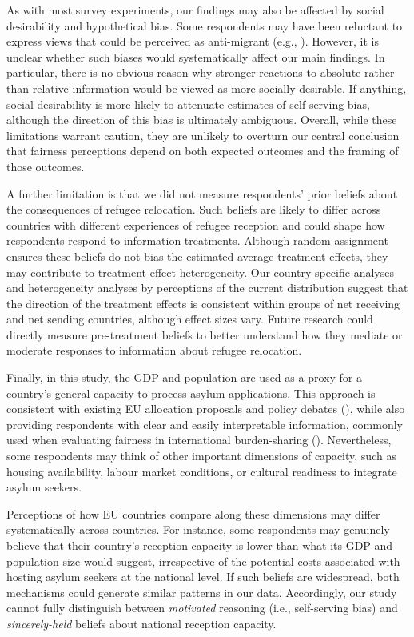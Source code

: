 \documentclass[
  12pt,
  a4paper,
]{article}
\begin{document}
As with most survey experiments, our findings may also be affected by social desirability and hypothetical bias. Some respondents may have been reluctant to express views that could be perceived as anti-migrant (e.g., ). However, it is unclear whether such biases would systematically affect our main findings. In particular, there is no obvious reason why stronger reactions to absolute rather than relative information would be viewed as more socially desirable. If anything, social desirability is more likely to attenuate estimates of self-serving bias, although the direction of this bias is ultimately ambiguous. Overall, while these limitations warrant caution, they are unlikely to overturn our central conclusion that fairness perceptions depend on both expected outcomes and the framing of those outcomes.

A further limitation is that we did not measure respondents' prior beliefs about the consequences of refugee relocation. Such beliefs are likely to differ across countries with different experiences of refugee reception and could shape how respondents respond to information treatments. Although random assignment ensures these beliefs do not bias the estimated average treatment effects, they may contribute to treatment effect heterogeneity. Our country-specific analyses and heterogeneity analyses by perceptions of the current distribution suggest that the direction of the treatment effects is consistent within groups of net receiving and net sending countries, although effect sizes vary. Future research could directly measure pre-treatment beliefs to better understand how they mediate or moderate responses to information about refugee relocation.

Finally, in this study, the GDP and population are used as a proxy for a country's general capacity to process asylum applications. This approach is consistent with existing EU allocation proposals and policy debates (), while also providing respondents with clear and easily interpretable information, commonly used when evaluating fairness in international burden-sharing (). Nevertheless, some respondents may think of other important dimensions of capacity, such as housing availability, labour market conditions, or cultural readiness to integrate asylum seekers.

Perceptions of how EU countries compare along these dimensions may differ systematically across countries. For instance, some respondents may genuinely believe that their country's reception capacity is lower than what its GDP and population size would suggest, irrespective of the potential costs associated with hosting asylum seekers at the national level. If such beliefs are widespread, both mechanisms could generate similar patterns in our data. Accordingly, our study cannot fully distinguish between \emph{motivated} reasoning (i.e., self-serving bias) and \emph{sincerely-held} beliefs about national reception capacity.
\end{document}
